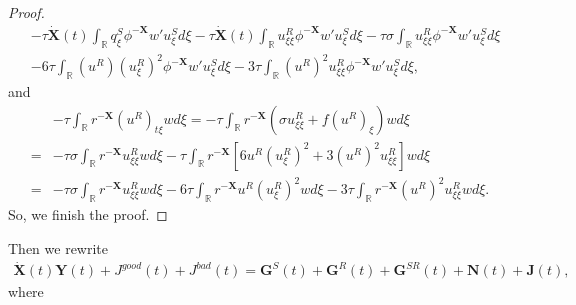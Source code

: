 \documentclass[10pt,reqno]{amsart}
\numberwithin{equation}{section}
\begin{document}
\begin{proof}
\begin{equation}
\begin{aligned}
				&-\tau\dot{\mathbf{X}}(t)\int_{\mathbb{R}}q_{\xi}^{S}\phi^{-\mathbf{X}}w'u_{\xi}^{S}d\xi-\tau\dot{{\mathbf{X}}}(t)\int_{\mathbb{R}}u_{\xi\xi}^{R}\phi^{-\mathbf{X}}w'u_{\xi}^{S}d\xi -\tau\sigma\int_{\mathbb{R}}u_{\xi\xi}^R\phi^{-\mathbf{X}}w'u_{\xi}^Sd\xi\\
				&- 6\tau\int_{\mathbb{R}}(u^{R})(u_{\xi}^{R})^{2}\phi^{-\mathbf{X}}w'u_{\xi}^{S}d\xi-3\tau\int_{\mathbb{R}}(u^{R})^{2}u_{\xi\xi}^{R}\phi^{-\mathbf{X}}w'u_{\xi}^{S}d\xi,
			\end{aligned}
		\end{equation}
		and
		\begin{align*}
			&-\tau\int_{\mathbb{R}}r^{-\mathbf{X}}\left(u^{R}\right)_{t\xi}wd\xi
			=-\tau\int_{\mathbb{R}}r^{-\mathbf{X}}\left(\sigma u_{\xi\xi}^{R}+f(u^R)_{\xi}\right)wd\xi\nonumber\\
			=&-\tau\sigma\int_{\mathbb{R}}r^{-\mathbf{X}}u_{\xi\xi}^Rwd\xi-\tau\int_{\mathbb{R}}r^{-\mathbf{X}}\left[6u^R(u_{\xi}^R)^2+3(u^R)^2u_{\xi\xi}^R\right]wd\xi\nonumber\\
			=&-\tau\sigma\int_{\mathbb{R}}r^{-\mathbf{X}}u_{\xi\xi}^Rwd\xi-6\tau\int_{\mathbb{R}}r^{-\mathbf{X}}u^R(u_{\xi}^R)^2wd\xi-3\tau\int_{\mathbb{R}}r^{-\mathbf{X}}(u^R)^2u_{\xi\xi}^Rwd\xi\nonumber.
		\end{align*}
		So, we finish the proof.
	\end{proof}
	Then we rewrite
		\begin{align}\label{lem3}
			\dot{\mathbf{X}}(t)\mathbf{Y}(t) + J^{good}(t) + J^{bad}(t)=\mathbf{G}^S(t)+\mathbf{G}^R(t)+\mathbf{G}^{SR}(t)+\mathbf{N}(t)+\mathbf{J}(t),
		\end{align}
		where 
\end{document}
